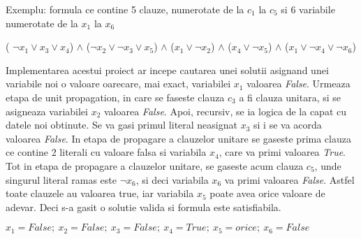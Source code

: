 Exemplu: formula ce contine 5 clauze, numerotate de la $c_1$ la $c_5$ si 6 variabile numerotate de la $ x_1 $ la $x_6$

( $\neg x_1 \lor x_3 \lor x_4 $) $\land$
($\neg x_2 \lor \neg x_3 \lor x_5$) $\land$
($x_1 \lor \neg x_2$) $\land$
($x_4  \lor \neg x_5$) $\land$
($x_1 \lor \neg x_4 \lor \neg x_6$)

Implementarea acestui proiect ar incepe cautarea unei solutii asignand unei variabile noi o valoare oarecare, mai exact, variabilei $x_1$ valoarea \textit{False}. Urmeaza etapa de unit propagation, in care se faseste clauza $c_3$ a fi clauza unitara, si se asigneaza variabilei $x_2$ valoarea \textit{False}.
Apoi, recursiv, se ia logica de la capat cu datele noi obtinute. Se va gasi primul literal neasignat $x_3$ si i se va acorda valoarea \textit{False}. In etapa de propagare a clauzelor unitare se gaseste prima clauza ce contine 2 literali cu valoare falsa si variabila $x_4$, care va primi valoarea \textit{True}. Tot in etapa de propagare a clauzelor unitare, se gaseste acum clauza $c_5$, unde singurul literal ramas este $\neg x_6$, si deci variabila $x_6$ va primi valoarea \textit{False}. Astfel toate clauzele au valoarea true, iar variabila $x_5$ poate avea orice valoare de adevar. Deci s-a gasit o solutie valida si formula este satisfiabila.

$x_1 = False ;~ x_2 = False ;~ x_3 = False ;~ x_4 = True ; ~x_5 = orice ;~ x_6 = False$

